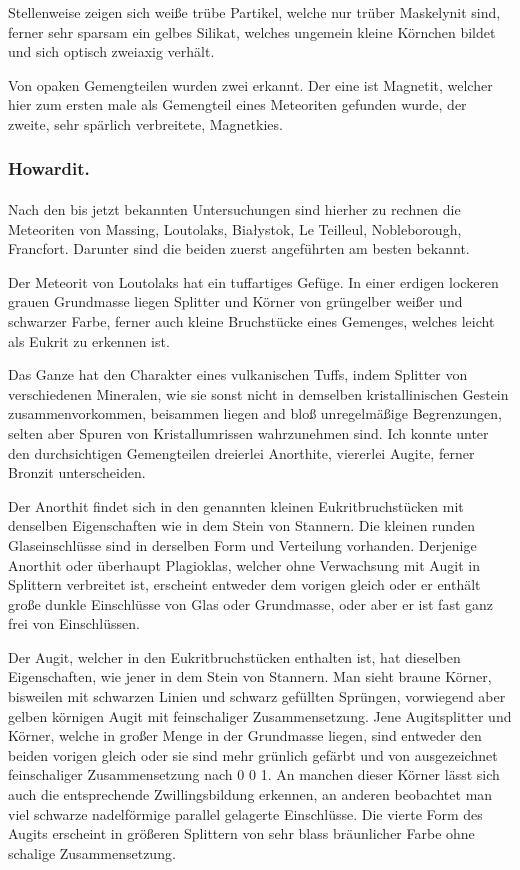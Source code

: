 \documentclass[a4paper, 11pt, oneside, polutonikogreek, german]{article}
\begin{document}
Stellenweise zeigen sich weiße trübe Partikel, welche nur trüber Maskelynit sind, ferner sehr sparsam ein gelbes Silikat, welches ungemein kleine Körnchen bildet und sich optisch zweiaxig verhält.

Von opaken Gemengteilen wurden zwei erkannt. Der eine ist Magnetit, welcher hier zum ersten male als Gemengteil eines Meteoriten gefunden wurde, der zweite, sehr spärlich verbreitete, Magnetkies.

\subsubsection{Howardit.}
\paragraph{}
Nach den bis jetzt bekannten Untersuchungen sind hierher zu rechnen die Meteoriten von Massing, Loutolaks, Białystok, Le Teilleul, Nobleborough, Francfort. Darunter sind die beiden zuerst angeführten am besten bekannt.

Der Meteorit von Loutolaks hat ein tuffartiges Gefüge. In einer erdigen lockeren grauen Grundmasse liegen Splitter und Körner von grüngelber weißer und schwarzer Farbe, ferner auch kleine Bruchstücke eines Gemenges, welches leicht als Eukrit zu erkennen ist.

Das Ganze hat den Charakter eines vulkanischen Tuffs, indem Splitter von verschiedenen Mineralen, wie sie sonst nicht in demselben kristallinischen Gestein zusammenvorkommen, beisammen liegen and bloß unregelmäßige Begrenzungen, selten aber Spuren von Kristallumrissen wahrzunehmen sind. Ich konnte unter den durchsichtigen Gemengteilen dreierlei Anorthite, viererlei Augite, ferner Bronzit unterscheiden.

Der Anorthit findet sich in den genannten kleinen Eukritbruchstücken mit denselben Eigenschaften wie in dem Stein von Stannern. Die kleinen runden Glaseinschlüsse sind in derselben Form und Verteilung vorhanden. Derjenige Anorthit oder überhaupt Plagioklas, welcher ohne Verwachsung mit Augit in Splittern verbreitet ist, erscheint entweder dem vorigen gleich oder er enthält große dunkle Einschlüsse von Glas oder Grundmasse, oder aber er ist fast ganz frei von Einschlüssen.

Der Augit, welcher in den Eukritbruchstücken enthalten ist, hat dieselben Eigenschaften, wie jener in dem Stein von Stannern. Man sieht braune Körner, bisweilen mit schwarzen Linien und schwarz gefüllten Sprüngen, vorwiegend aber gelben körnigen Augit mit feinschaliger Zusammensetzung. Jene Augitsplitter und Körner, welche in großer Menge in der Grundmasse liegen, sind entweder den beiden vorigen gleich oder sie sind mehr grünlich gefärbt und von ausgezeichnet feinschaliger Zusammensetzung nach 0 0 1. An manchen dieser Körner lässt sich auch die entsprechende Zwillingsbildung erkennen, an anderen beobachtet man viel schwarze nadelförmige parallel gelagerte Einschlüsse. Die vierte Form des Augits erscheint in größeren Splittern von sehr blass bräunlicher Farbe ohne schalige Zusammensetzung.
\end{document}
